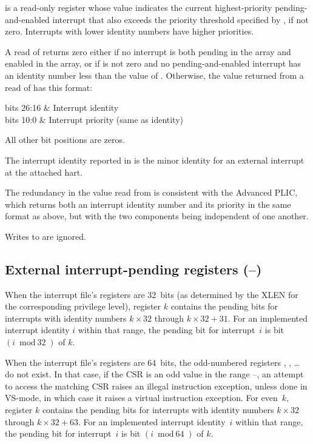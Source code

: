  is a read-only register whose value indicates the current
highest-priority pending-and-enabled interrupt that also exceeds the
priority threshold specified by , if not zero.
Interrupts with lower identity numbers have higher priorities.

A read of  returns zero either if no interrupt is both
pending in the  array and enabled in the  array, or if
 is not zero and no pending-and-enabled interrupt has an
identity number less than the value of .
Otherwise, the value returned from a read of  has this format:
\begin{displayLinesTable}[l@{\quad}l]
bits 26:16 & Interrupt identity \\
bits 10:0  & Interrupt priority (same as identity) \\
\end{displayLinesTable}
All other bit positions are zeros.

The interrupt identity reported in  is the minor identity for
an external interrupt at the attached hart.

\begin{commentary}
The redundancy in the value read from  is consistent with the
Advanced PLIC, which returns both an interrupt identity number and its
priority in the same format as above, but with the two components being
independent of one another.
\end{commentary}

Writes to  are ignored.

\subsection{External interrupt-pending registers (--)}

When the interrupt file's registers are 32~bits (as determined by
the XLEN for the corresponding privilege level), register $k$
contains the pending bits for interrupts with identity numbers
$k\times\mbox{32}$ through ${k\times\mbox{32} + \mbox{31}}$.
For an implemented interrupt identity $i$ within that range, the
pending bit for interrupt~$i$ is bit $(i\bmod\mbox{32})$ of $k$.

When the interrupt file's registers are 64~bits, the odd-numbered
registers , , \dots {} do not exist.
In that case, if the  CSR is an odd value in the range
--, an attempt to access the matching  CSR
raises an illegal instruction exception, unless done in VS-mode, in
which case it raises a virtual instruction exception.
For even~$k$, register $k$ contains the pending bits
for interrupts with identity numbers $k\times\mbox{32}$ through
${k\times\mbox{32} + \mbox{63}}$.
For an implemented interrupt identity~$i$ within that range, the
pending bit for interrupt~$i$ is bit $(i\bmod\mbox{64})$ of $k$.

